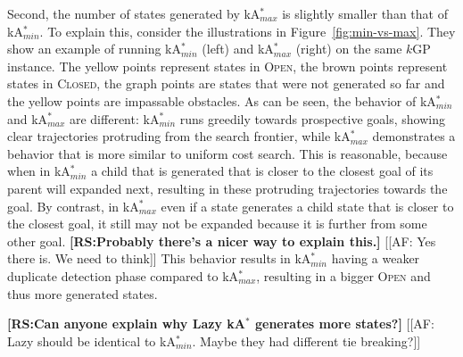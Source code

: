 \documentclass{aicom2e}
\newcommand{\kgs}{$k$GP}
\newcommand{\kastar}{kA$^*$}
\newcommand{\kastarmin}{kA$^*_{min}$}
\newcommand{\kastarmax}{kA$^*_{max}$}
\newcommand{\open}{\textsc{Open}}
\newcommand{\closed}{\textsc{Closed}}
\newcommand{\roni}[1]{\textbf{[RS:#1]}}
\begin{document}
Second, the number of states generated by \kastarmax{} is slightly smaller than that of \kastarmin{}. To explain this, consider the illustrations in Figure~\ref{fig:min-vs-max}. They show an example of running \kastarmin{} (left) and \kastarmax{} (right) on the same \kgs{} instance. The yellow points represent states in \open{}, the brown points represent states in \closed{}, the graph points are states that were not generated so far and the yellow points are impassable obstacles. As can be seen, the behavior of \kastarmin{} and \kastarmax{} are different: \kastarmin{} runs greedily towards prospective goals, showing clear trajectories protruding from the search frontier, while \kastarmax{} demonstrates a behavior that is more similar to uniform cost search. This is reasonable, because when in \kastarmin{} a child that is generated that is closer to the closest goal of its parent will expanded next, resulting in these protruding trajectories towards the goal. By contrast, in \kastarmax{} even if a state generates a child state that is closer to the closest goal, it still may not be expanded because it is further from some other goal. \roni{Probably there's a nicer way to explain this.}
[[AF: Yes there is. We need to think]]
This behavior results in \kastarmin{} having a weaker duplicate detection phase compared to \kastarmax{}, resulting in a bigger \open{} and thus more generated states.

\roni{Can anyone explain why Lazy \kastar{} generates more states?}
[[AF: Lazy should be identical to \kastarmin{}. Maybe they had different tie breaking?]]
\end{document}
